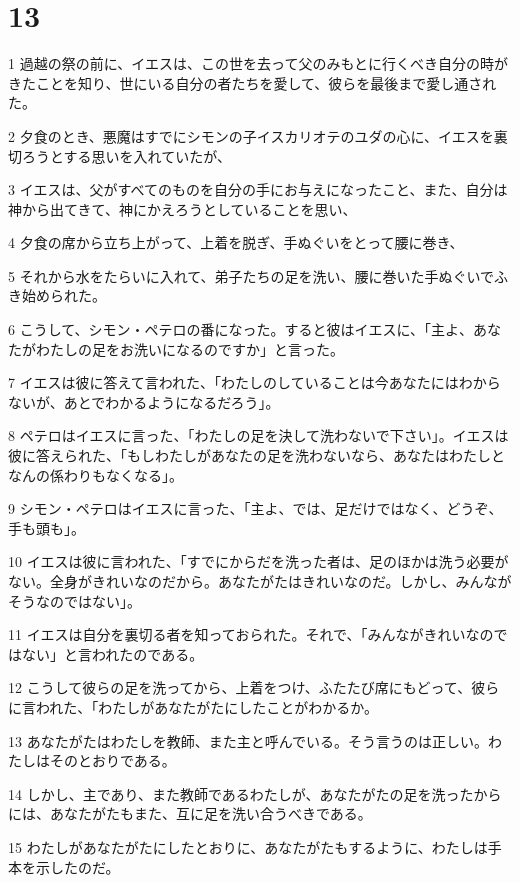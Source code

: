 \chapter{13}

\par 1 過越の祭の前に、イエスは、この世を去って父のみもとに行くべき自分の時がきたことを知り、世にいる自分の者たちを愛して、彼らを最後まで愛し通された。
\par 2 夕食のとき、悪魔はすでにシモンの子イスカリオテのユダの心に、イエスを裏切ろうとする思いを入れていたが、
\par 3 イエスは、父がすべてのものを自分の手にお与えになったこと、また、自分は神から出てきて、神にかえろうとしていることを思い、
\par 4 夕食の席から立ち上がって、上着を脱ぎ、手ぬぐいをとって腰に巻き、
\par 5 それから水をたらいに入れて、弟子たちの足を洗い、腰に巻いた手ぬぐいでふき始められた。
\par 6 こうして、シモン・ペテロの番になった。すると彼はイエスに、「主よ、あなたがわたしの足をお洗いになるのですか」と言った。
\par 7 イエスは彼に答えて言われた、「わたしのしていることは今あなたにはわからないが、あとでわかるようになるだろう」。
\par 8 ペテロはイエスに言った、「わたしの足を決して洗わないで下さい」。イエスは彼に答えられた、「もしわたしがあなたの足を洗わないなら、あなたはわたしとなんの係わりもなくなる」。
\par 9 シモン・ペテロはイエスに言った、「主よ、では、足だけではなく、どうぞ、手も頭も」。
\par 10 イエスは彼に言われた、「すでにからだを洗った者は、足のほかは洗う必要がない。全身がきれいなのだから。あなたがたはきれいなのだ。しかし、みんながそうなのではない」。
\par 11 イエスは自分を裏切る者を知っておられた。それで、「みんながきれいなのではない」と言われたのである。
\par 12 こうして彼らの足を洗ってから、上着をつけ、ふたたび席にもどって、彼らに言われた、「わたしがあなたがたにしたことがわかるか。
\par 13 あなたがたはわたしを教師、また主と呼んでいる。そう言うのは正しい。わたしはそのとおりである。
\par 14 しかし、主であり、また教師であるわたしが、あなたがたの足を洗ったからには、あなたがたもまた、互に足を洗い合うべきである。
\par 15 わたしがあなたがたにしたとおりに、あなたがたもするように、わたしは手本を示したのだ。
